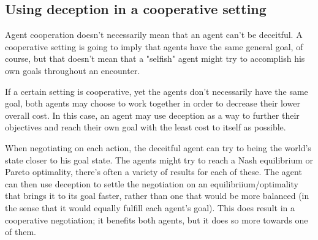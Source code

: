 \documentclass{aamas2017}
\begin{document}
    \subsection{Using deception in a cooperative setting}
        \par
        Agent cooperation doesn't necessarily mean that an agent can't be deceitful. A cooperative setting is going to imply that agents have the same general goal, of course, but that doesn't mean that a "selfish" agent might try to accomplish his own goals throughout an encounter.
        \par
        If a certain setting is cooperative, yet the agents don't necessarily have the same goal, both agents may choose to work together in order to decrease their lower overall cost. In this case, an agent may use deception as a way to  further their objectives and reach their own goal with the least cost to itself as possible.
        \par
        When negotiating on each action, the deceitful agent can try to being the world's state closer to his goal state. The agents might try to reach a Nash equilibrium or Pareto optimality, there's often a variety of results for each of these. The agent can then use deception to settle the negotiation on an equilibriium/optimality that brings it to its goal faster, rather than one that would be more balanced (in the sense that it would equally fulfill each agent's goal). This does result in a cooperative negotiation; it benefits both agents, but it does so more towards one of them.
\end{document}

